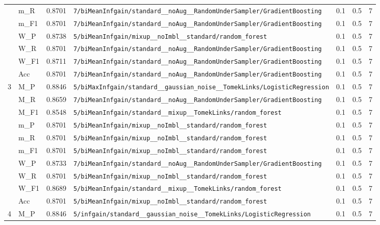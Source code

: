 \begin{table}[htbp]
\begin{tabular}{|c|l|c|>{\ttfamily\footnotesize}p{7.2cm}|c|c|c|}
 & m\_R & 0.8701 & \texttt{7/biMeanInfgain/standard\_\_noAug\_\_RandomUnderSampler/GradientBoosting} & 0.1 & 0.5  & 7 \\ 
 & m\_F1 & 0.8701 & \texttt{7/biMeanInfgain/standard\_\_noAug\_\_RandomUnderSampler/GradientBoosting} & 0.1 & 0.5  & 7 \\ 
 & W\_P & 0.8738 & \texttt{5/biMeanInfgain/mixup\_\_noImbl\_\_standard/random\_forest} & 0.1 & 0.5  & 7 \\ 
 & W\_R & 0.8701 & \texttt{7/biMeanInfgain/standard\_\_noAug\_\_RandomUnderSampler/GradientBoosting} & 0.1 & 0.5  & 7 \\ 
 & W\_F1 & 0.8711 & \texttt{7/biMeanInfgain/standard\_\_noAug\_\_RandomUnderSampler/GradientBoosting} & 0.1 & 0.5  & 7 \\ 
 & Acc & 0.8701 & \texttt{7/biMeanInfgain/standard\_\_noAug\_\_RandomUnderSampler/GradientBoosting} & 0.1 & 0.5  & 7 \\ 
\hline
\multirow{10}{*}{3} & M\_P & 0.8846 & \texttt{5/biMaxInfgain/standard\_\_gaussian\_noise\_\_TomekLinks/LogisticRegression} & 0.1 & 0.5  & 7 \\ 
 & M\_R & 0.8659 & \texttt{7/biMeanInfgain/standard\_\_noAug\_\_RandomUnderSampler/GradientBoosting} & 0.1 & 0.5  & 7 \\ 
 & M\_F1 & 0.8548 & \texttt{5/biMeanInfgain/standard\_\_mixup\_\_TomekLinks/random\_forest} & 0.1 & 0.5  & 7 \\ 
 & m\_P & 0.8701 & \texttt{5/biMeanInfgain/mixup\_\_noImbl\_\_standard/random\_forest} & 0.1 & 0.5  & 7 \\ 
 & m\_R & 0.8701 & \texttt{5/biMeanInfgain/mixup\_\_noImbl\_\_standard/random\_forest} & 0.1 & 0.5  & 7 \\ 
 & m\_F1 & 0.8701 & \texttt{5/biMeanInfgain/mixup\_\_noImbl\_\_standard/random\_forest} & 0.1 & 0.5  & 7 \\ 
 & W\_P & 0.8733 & \texttt{7/biMeanInfgain/standard\_\_noAug\_\_RandomUnderSampler/GradientBoosting} & 0.1 & 0.5  & 7 \\ 
 & W\_R & 0.8701 & \texttt{5/biMeanInfgain/mixup\_\_noImbl\_\_standard/random\_forest} & 0.1 & 0.5  & 7 \\ 
 & W\_F1 & 0.8689 & \texttt{5/biMeanInfgain/standard\_\_mixup\_\_TomekLinks/random\_forest} & 0.1 & 0.5  & 7 \\ 
 & Acc & 0.8701 & \texttt{5/biMeanInfgain/mixup\_\_noImbl\_\_standard/random\_forest} & 0.1 & 0.5  & 7 \\ 
\hline
\multirow{10}{*}{4} & M\_P & 0.8846 & \texttt{5/infgain/standard\_\_gaussian\_noise\_\_TomekLinks/LogisticRegression} & 0.1 & 0.5  & 7 \\ 

\end{tabular}
\end{table}
